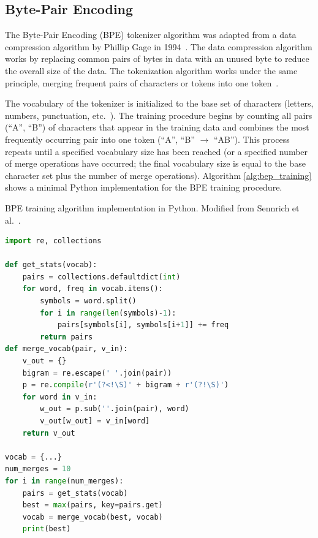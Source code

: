 \documentclass[12pt]{article}
\begin{document}
\subsection{Byte-Pair Encoding}\label{sec:bpe}
The Byte-Pair Encoding (BPE) tokenizer algorithm was adapted from a data compression algorithm by Phillip Gage in 1994~\cite{gage_feb94_1994}. The data compression algorithm works by replacing common pairs of bytes in data with an unused byte to reduce the overall size of the data. The tokenization algorithm works under the same principle, merging frequent pairs of characters or tokens into one token~\cite{sennrich_neural_2016}.

The vocabulary of the tokenizer is initialized to the base set of characters (letters, numbers, punctuation, etc.~). The training procedure begins by counting all pairs (``A'', ``B'') of characters that appear in the training data and combines the most frequently occurring pair into one token (``A'', ``B'' $\rightarrow$ ``AB''). This process repeats until a specified vocabulary size has been reached (or a specified number of merge operations have occurred; the final vocabulary size is equal to the base character set plus the number of merge operations). Algorithm \ref{alg:bep_training} shows a minimal Python implementation for the BPE training procedure.

\begin{algorithm}[!t]
    \caption{BPE training algorithm implementation in Python. Modified from Sennrich et al.~\cite{sennrich_neural_2016}.}
    \label{alg:bep_training}
    \begin{lstlisting}[language=Python]
import re, collections

def get_stats(vocab):
    pairs = collections.defaultdict(int)
    for word, freq in vocab.items():
        symbols = word.split()
        for i in range(len(symbols)-1):
            pairs[symbols[i], symbols[i+1]] += freq
        return pairs
def merge_vocab(pair, v_in):
    v_out = {}
    bigram = re.escape(' '.join(pair))
    p = re.compile(r'(?<!\S)' + bigram + r'(?!\S)')
    for word in v_in:
        w_out = p.sub(''.join(pair), word)
        v_out[w_out] = v_in[word]
    return v_out

vocab = {...}
num_merges = 10
for i in range(num_merges):
    pairs = get_stats(vocab)
    best = max(pairs, key=pairs.get)
    vocab = merge_vocab(best, vocab)
    print(best)
    \end{lstlisting}
\end{algorithm}
\end{document}
